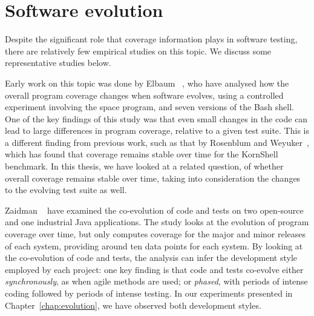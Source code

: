 \section{Software evolution}
\label{related:evolution}

Despite the significant role that coverage information plays in
software testing, there are relatively few empirical studies on this
topic.  We discuss some representative studies below.

Early work on this topic was done by Elbaum \etal~\cite{cov-evol:icsm01}, who
have analysed how the overall program coverage changes when software evolves,
using a controlled experiment involving the \textsf{space} program, and seven
versions of the Bash shell.  One of the key findings of this study was that
even small changes in the code can lead to large differences in program
coverage, relative to a given test suite.  This is a different finding from
previous work, such as that by Rosenblum and Weyuker~\cite{cov_regr97}, which
has found that coverage remains stable over time for the KornShell benchmark.
In this thesis, we have looked at a related question, of whether overall
coverage remains stable over time, taking into consideration the changes to the
evolving test suite as well.

Zaidman \etal~\cite{coevol:emse11} have examined the co-evolution of
code and tests on two open-source and one industrial Java
applications.  The study looks at the evolution of program coverage
over time, but only computes coverage for the major and minor releases
of each system, providing around ten data points for each system.  By
looking at the co-evolution of code and tests, the analysis can infer the
development style employed by each project: one key finding is that code and
tests co-evolve either \emph{synchronously}, as when agile methods are used; or
\emph{phased}, with periods of intense coding followed by periods of intense
testing. In our experiments presented in Chapter~\ref{chap:evolution}, we have
observed both development styles.


